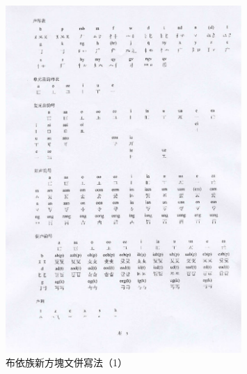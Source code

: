 \documentclass[a5paper, 10pt, openany]{book} %
\begin{document}
\begin{figure}[h]
  \centering
  \includegraphics[width=0.8\textwidth]{./images/aros_buyizu_2.png}
  \caption{布依族新方塊文併寫法（1）}
\end{figure}
 
\end{document}
